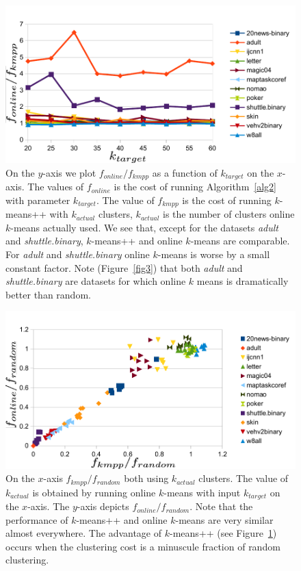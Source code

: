 \documentclass{article}
\begin{document}
\begin{figure}[htbp]
\begin{center}
\includegraphics{figures/plot4.pdf}
\caption{On the $y$-axis we plot $f_{online}/f_{kmpp}$ as a function of $k_{target}$ on the $x$-axis. The values of $f_{online}$ is the cost of running Algorithm~\ref{alg2} with parameter $k_{target}$.
The value of $f_{kmpp}$ is the cost of running $k$-means++ with $k_{actual}$ clusters, $k_{actual}$ is the number of clusters online $k$-means actually used.
We see that, except for the datasets \emph{adult} and \emph{shuttle.binary}, $k$-means++ and online $k$-means are comparable. For \emph{adult} and \emph{shuttle.binary} online $k$-means is worse by a small constant factor. Note (Figure~\ref{fig3}) that both \emph{adult} and \emph{shuttle.binary} are datasets for which online $k$ means is dramatically better than random.}
\label{fig4}
\end{center}
\end{figure}

\begin{figure}[htbp]
\begin{center}
\includegraphics{figures/plot5.pdf}
\caption{On the $x$-axis $f_{kmpp}/f_{random}$ both using $k_{actual}$ clusters. 
The value of $k_{actual}$ is obtained by running online $k$-means with input $k_{target}$ on the $x$-axis.
The $y$-axis depicts $f_{online}/f_{random}$. 
Note that the performance of $k$-means++ and online $k$-means are very similar almost everywhere.
The advantage of $k$-means++ (see Figure~\ref{fig4}) occurs when the clustering cost is a minuscule fraction of random clustering.}
\label{fig5}
\end{center}
\end{figure}
  
\end{document}
